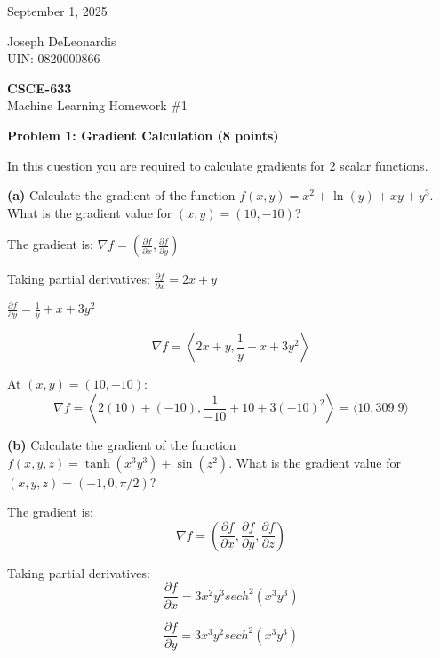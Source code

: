 \documentclass{article}
\begin{document}
\noindent
\begin{minipage}[t]{0.5\textwidth}
    \raggedright
    September 1, 2025
\end{minipage}%
\begin{minipage}[t]{0.5\textwidth}
    \raggedleft
    Joseph DeLeonardis\\
    UIN: 0820000866
\end{minipage}

\vspace{0.5cm}

\begin{center}
    \textbf{\Large CSCE-633}\\
    Machine Learning Homework \#1
\end{center}

\vspace{1cm}

\textbf{Problem 1: Gradient Calculation (8 points)}

In this question you are required to calculate gradients for 2 scalar functions.

\textbf{(a)} Calculate the gradient of the function $f(x, y) = x^2 + \ln(y) + xy + y^3$. What is the gradient value for $(x, y) = (10, -10)$?

The gradient is:
$\nabla f = \left(\frac{\partial f}{\partial x}, \frac{\partial f}{\partial y}\right)$

Taking partial derivatives:
$\frac{\partial f}{\partial x} = 2x + y$

$\frac{\partial f}{\partial y} = \frac{1}{y} + x + 3y^2$

$$\nabla f = \left\langle 2x + y, \frac{1}{y} + x + 3y^2 \right\rangle$$


At $(x, y) = (10, -10)$:
$$\nabla f = \left\langle 2(10) + (-10), \frac{1}{-10} + 10 + 3(-10)^2 \right\rangle = \langle 10, 309.9 \rangle$$

\textbf{(b)} Calculate the gradient of the function $f(x, y, z) = \tanh(x^3y^3) + \sin(z^2)$. What is the gradient value for $(x, y, z) = (-1, 0, \pi/2)$?


The gradient is:
$$\nabla f = \left(\frac{\partial f}{\partial x}, \frac{\partial f}{\partial y}, \frac{\partial f}{\partial z}\right)$$

Taking partial derivatives:
$$\frac{\partial f}{\partial x} = 3x^2y^3 sech^2(x^3y^3)$$

$$\frac{\partial f}{\partial y} = 3x^3y^2 sech^2(x^3y^3)$$
\end{document}
